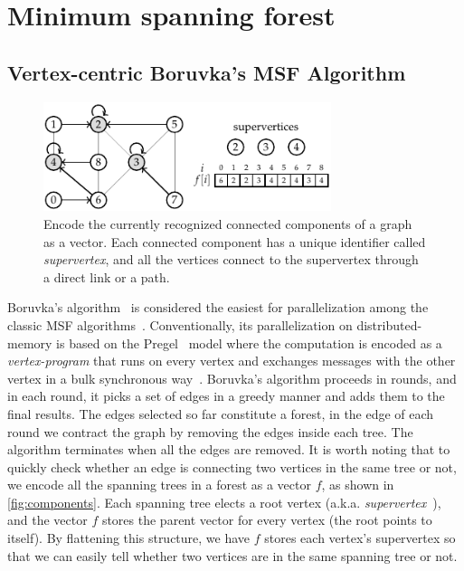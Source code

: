 \documentclass{sokendai_thesis} %
\newcommand{\boruvka}[0]{Boruvka}
\begin{document}
\section{Minimum spanning forest}

\subsection{Vertex-centric \boruvka{}'s MSF Algorithm}
\label{sec:boruvka}

\begin{figure}
\includegraphics[width=0.75\textwidth]{figures/components.pdf}
\caption{Encode the currently recognized connected components of a graph as a vector. Each connected component has a unique identifier called \emph{supervertex}, and all the vertices connect to the supervertex through a direct link or a path.}
\vspace{-8pt}
\label{fig:components}
\end{figure}

\boruvka{}'s algorithm~\cite{boruvka} is considered the easiest for parallelization among the classic MSF algorithms~\cite{boruvka,kruskal,prim}.
Conventionally, its parallelization on distributed-memory is based on the Pregel~\cite{pregel} model where the computation is encoded as a \textit{vertex-program} that runs on every vertex and exchanges messages with the other vertex in a bulk synchronous way~\cite{bsp}.
\boruvka{}'s algorithm proceeds in rounds, and in each round, it picks a set of edges in a greedy manner and adds them to the final results.
The edges selected so far constitute a forest, in the edge of each round we contract the graph by removing the edges inside each tree.
The algorithm terminates when all the edges are removed.
It is worth noting that to quickly check whether an edge is connecting two vertices in the same tree or not, we encode all the spanning trees in a forest as a vector $f$, as shown in \autoref{fig:components}.
Each spanning tree elects a root vertex (a.k.a. \emph{supervertex}~\cite{salihoglu2014optimizing}), and the vector $f$ stores the parent vector for every vertex (the root points to itself). %
By flattening this structure, we have $f$ stores each vertex's supervertex so that we can easily tell whether two vertices are in the same spanning tree or not.
\end{document}
